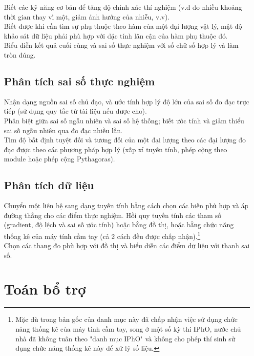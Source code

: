 \documentclass{article}
\begin{document}
\begin{multicols}{2}
Biết các kỹ năng cơ bản để tăng độ chính xác thí nghiệm (v.d đo nhiều khoảng thời gian thay vì một, giảm ảnh hưởng của nhiễu, v.v).\\

Biết được khi cần tìm sự phụ thuộc theo hàm của một đại lượng vật lý, mật độ khảo sát dữ liệu phải phù hợp với đặc tính lân cận của hàm phụ thuộc đó.\\

Biểu diễn kết quả cuối cùng và sai số thực nghiệm với số chữ số hợp lý và làm tròn đúng.\\

\subsection{Phân tích sai số thực nghiệm}
Nhận dạng nguồn sai số chủ đạo, và ước tính hợp lý độ lớn của sai số đo đạc trực tiếp (sử dụng quy tắc từ tài liệu nếu được cho).\\

Phân biệt giữa sai số ngẫu nhiên và sai số hệ thống; biết ước tính và giảm thiểu sai số ngẫu nhiên qua đo đạc nhiều lần.\\

Tìm độ bất định tuyệt đối và tương đối của một đại lượng theo các đại lượng đo đạc được theo các phương pháp hợp lý (xấp xỉ tuyến tính, phép cộng theo module hoặc phép cộng Pythagoras).

\subsection{Phân tích dữ liệu}
Chuyển một liên hệ sang dạng tuyến tính bằng cách chọn các biến phù hợp và áp đường thẳng cho các điểm thực nghiệm. Hồi quy tuyến tính các tham số (gradient, độ lệch và sai số ước tính) hoặc bằng đồ thị, hoặc bằng chức năng thống kê của máy tính cầm tay (cả 2 cách đều được chấp nhận).\footnote{Mặc dù trong bản gốc của danh mục này đã chấp nhận việc sử dụng chức năng thống kê của máy tính cầm tay, song ở một số kỳ thi IPhO, nước chủ nhà đã không tuân theo "danh mục IPhO" và không cho phép thí sinh sử dụng chức năng thống kê này để xử lý số liệu.}\\

Chọn các thang đo phù hợp với đồ thị và biểu diễn các điểm dữ liệu với thanh sai số.\\

\section{Toán bổ trợ}

\end{multicols}
\end{document}
